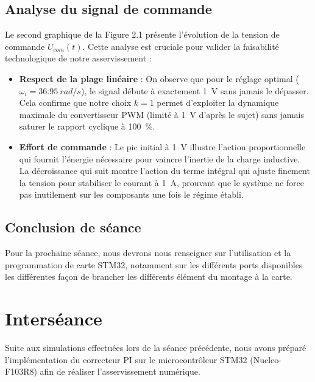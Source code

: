 \documentclass[11pt]{report}
\begin{document}
\section{Analyse du signal de commande}
Le second graphique de la Figure 2.1 présente l'évolution de la tension de commande $U_{com}(t)$. Cette analyse est cruciale pour valider la faisabilité technologique de notre asservissement :

\begin{itemize}
    \item \textbf{Respect de la plage linéaire} : On observe que pour le réglage optimal ($\omega_i = \qty{36,95}{rad/s}$), le signal débute à exactement \qty{1}{V} sans jamais le dépasser. Cela confirme que notre choix $k=1$ permet d'exploiter la dynamique maximale du convertisseur PWM (limité à \qty{1}{V} d'après le sujet) sans jamais saturer le rapport cyclique à \qty{100}{\%}.
    \item \textbf{Effort de commande} : Le pic initial à \qty{1}{V} illustre l'action proportionnelle qui fournit l'énergie nécessaire pour vaincre l'inertie de la charge inductive. La décroissance qui suit montre l'action du terme intégral qui ajuste finement la tension pour stabiliser le courant à \qty{1}{A}, prouvant que le système ne force pas inutilement sur les composants une fois le régime établi.
\end{itemize}

\section{Conclusion de séance}
Pour la prochaine séance, nous devrons nous renseigner sur l’utilisation et la programmation de carte
STM32, notamment sur les différents ports disponibles les différentes façon de brancher les différents
élément du montage à la carte.

\chapter*{Interséance}

Suite aux simulations effectuées lors de la séance précédente, nous avons préparé l'implémentation du correcteur PI sur le microcontrôleur STM32 (Nucleo-F103R8) afin de réaliser l'asservissement numérique.
\end{document}

